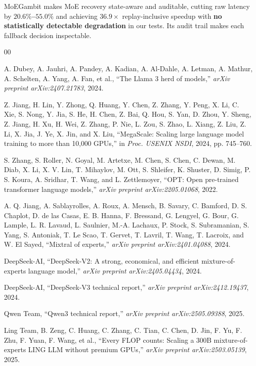 \documentclass[10pt,conference]{IEEEtran}
\begin{document}
MoEGambit makes MoE recovery state-aware and auditable, cutting raw latency by \textbf{$20.6\%$--$55.0\%$} and achieving \textbf{$36.9\times$} replay-inclusive speedup with \textbf{no statistically detectable degradation} in our tests. Its audit trail makes each fallback decision inspectable.

\begin{thebibliography}{00}

 A. Dubey, A. Jauhri, A. Pandey, A. Kadian, A. Al-Dahle, A. Letman, A. Mathur, A. Schelten, A. Yang, A. Fan, et al., ``The Llama 3 herd of models,'' \textit{arXiv preprint arXiv:2407.21783}, 2024.

 Z. Jiang, H. Lin, Y. Zhong, Q. Huang, Y. Chen, Z. Zhang, Y. Peng, X. Li, C. Xie, S. Nong, Y. Jia, S. He, H. Chen, Z. Bai, Q. Hou, S. Yan, D. Zhou, Y. Sheng, Z. Jiang, H. Xu, H. Wei, Z. Zhang, P. Nie, L. Zou, S. Zhao, L. Xiang, Z. Liu, Z. Li, X. Jia, J. Ye, X. Jin, and X. Liu, ``MegaScale: Scaling large language model training to more than 10,000 GPUs,'' in \textit{Proc. USENIX NSDI}, 2024, pp. 745--760.

 S. Zhang, S. Roller, N. Goyal, M. Artetxe, M. Chen, S. Chen, C. Dewan, M. Diab, X. Li, X. V. Lin, T. Mihaylov, M. Ott, S. Shleifer, K. Shuster, D. Simig, P. S. Koura, A. Sridhar, T. Wang, and L. Zettlemoyer, ``OPT: Open pre-trained transformer language models,'' \textit{arXiv preprint arXiv:2205.01068}, 2022.

 A. Q. Jiang, A. Sablayrolles, A. Roux, A. Mensch, B. Savary, C. Bamford, D. S. Chaplot, D. de las Casas, E. B. Hanna, F. Bressand, G. Lengyel, G. Bour, G. Lample, L. R. Lavaud, L. Saulnier, M.-A. Lachaux, P. Stock, S. Subramanian, S. Yang, S. Antoniak, T. Le Scao, T. Gervet, T. Lavril, T. Wang, T. Lacroix, and W. El Sayed, ``Mixtral of experts,'' \textit{arXiv preprint arXiv:2401.04088}, 2024.

 DeepSeek-AI, ``DeepSeek-V2: A strong, economical, and efficient mixture-of-experts language model,'' \textit{arXiv preprint arXiv:2405.04434}, 2024.

 DeepSeek-AI, ``DeepSeek-V3 technical report,'' \textit{arXiv preprint arXiv:2412.19437}, 2024.

 Qwen Team, ``Qwen3 technical report,'' \textit{arXiv preprint arXiv:2505.09388}, 2025.

 Ling Team, B. Zeng, C. Huang, C. Zhang, C. Tian, C. Chen, D. Jin, F. Yu, F. Zhu, F. Yuan, F. Wang, et al., ``Every FLOP counts: Scaling a 300B mixture-of-experts LING LLM without premium GPUs,'' \textit{arXiv preprint arXiv:2503.05139}, 2025.


\end{thebibliography}
\end{document}

